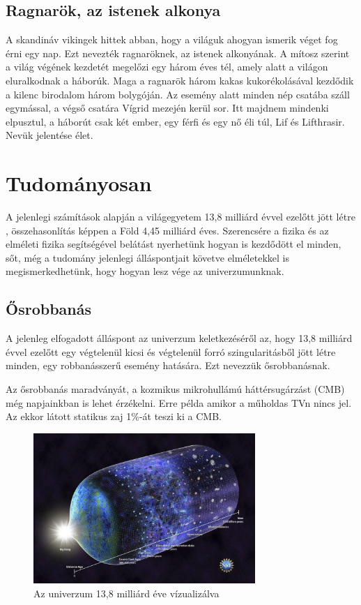 \documentclass[a4paper]{article}
\begin{document}
\subsection*{Ragnarök, az istenek alkonya}
A skandináv vikingek hittek abban, hogy a világuk ahogyan ismerik véget fog érni egy nap. Ezt nevezték ragnaröknek, az istenek alkonyának. A mítosz szerint a világ végének kezdetét megelőzi egy három éves tél, amely alatt a világon eluralkodnak a háborúk. Maga a ragnarök három kakas kukorékolásával kezdődik a kilenc birodalom három bolygóján. Az esemény alatt minden nép csatába száll egymással, a végső csatára Vígrid mezején kerül sor. Itt majdnem mindenki elpusztul, a háborút csak két ember, egy férfi és egy nő éli túl, Lif és Lifthrasir. Nevük jelentése élet.
\cite{edda, skandinavmitologia}

\section*{Tudományosan}
A jelenlegi számítások alapján a világegyetem 13,8 milliárd évvel ezelőtt jött létre \cite{univerzumkora}, összehasonlítás képpen a Föld 4,45 milliárd éves. \cite{foldkora} Szerencsére a fizika és az elméleti fizika segítségével belátást nyerhetünk hogyan is kezdődött el minden, sőt, még a tudomány jelenlegi álláspontjait követve elméletekkel is megismerkedhetünk, hogy hogyan lesz vége az univerzumunknak.

\subsection*{Ősrobbanás}
A jelenleg elfogadott álláspont az univerzum keletkezéséről az, hogy 13,8 milliárd évvel ezelőtt \cite{univerzumkora} egy végtelenül kicsi és végtelenül forró szingularitásből jött létre minden, egy robbanásszerű esemény hatására. Ezt nevezzük ősrobbanásnak. \cite{big}
\par
{
    \footnotesize
    Az ősrobbanás maradványát, a kozmikus mikrohullámú háttérsugárzást (CMB) még napjainkban is lehet érzékelni. Erre példa amikor a műholdas TVn nincs jel. Az ekkor látott statikus zaj 1\%-át teszi ki a CMB.
}

\begin{figure}
    \centering
    \includegraphics[width=0.75\textwidth]{bigbang.jpg}
    \caption{Az univerzum 13,8 milliárd éve vízualizálva}
    \label{fig:bigbang}
\end{figure}
    
\end{document}
